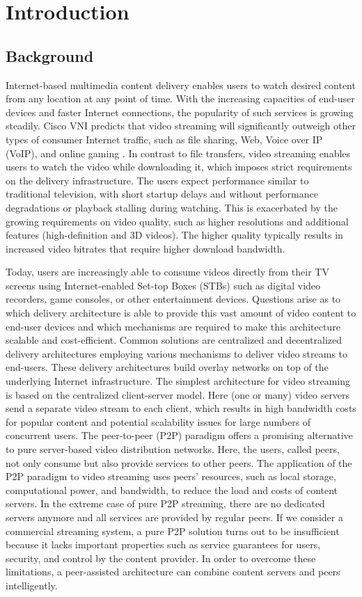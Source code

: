 \chapter{Introduction}
\section{Background}
Internet-based multimedia content delivery enables users to watch desired content from any location at any point of time. 
With the increasing capacities of end-user devices and faster Internet connections, the popularity of such services is growing steadily. 
Cisco VNI predicts that video streaming will significantly outweigh other types of consumer Internet traffic, such as file sharing, Web, Voice over IP (VoIP), and online gaming \cite{ciscovni}. 
In contrast to file transfers, video streaming enables users to watch the video while downloading it, which imposes strict requirements on the delivery infrastructure. 
The users expect performance similar to traditional television, with short startup delays and without performance degradations or playback stalling during watching. This is exacerbated by the growing requirements on video quality, such as higher resolutions and additional features (high-definition and 3D videos). 
The higher quality typically results in increased video bitrates that require higher download bandwidth.

Today, users are increasingly able to consume videos directly from their TV screens using Internet-enabled Set-top Boxes (STBs) such as digital video recorders, game consoles, or other entertainment devices. 
Questions arise as to which delivery architecture is able to provide this vast amount of video content to end-user devices and which mechanisms are required to make this architecture scalable and cost-efficient. 
Common solutions are centralized and decentralized delivery architectures employing various mechanisms to deliver video streams to end-users. 
These delivery architectures build overlay networks on top of the underlying Internet infrastructure.
The simplest architecture for video streaming is based on the centralized client-server model. Here (one or many) video servers send a separate video stream to each client, which results in high bandwidth costs for popular content and potential scalability issues for large numbers of concurrent users. 
The peer-to-peer (P2P) paradigm offers a promising alternative to pure server-based video distribution networks. 
Here, the users, called peers, not only consume but also provide services to other peers. The application of the P2P paradigm to video streaming uses peers’ resources, such as local storage, computational power, and bandwidth, to reduce the load and costs of content servers. In the extreme case of pure P2P streaming, there are no dedicated servers anymore and all services are provided by regular peers.
If we consider a commercial streaming system, a pure P2P solution turns out to be insufficient because it lacks important properties such as service guarantees for users, security, and control by the content provider. 
In order to overcome these limitations, a peer-assisted architecture can combine content servers and peers intelligently.

